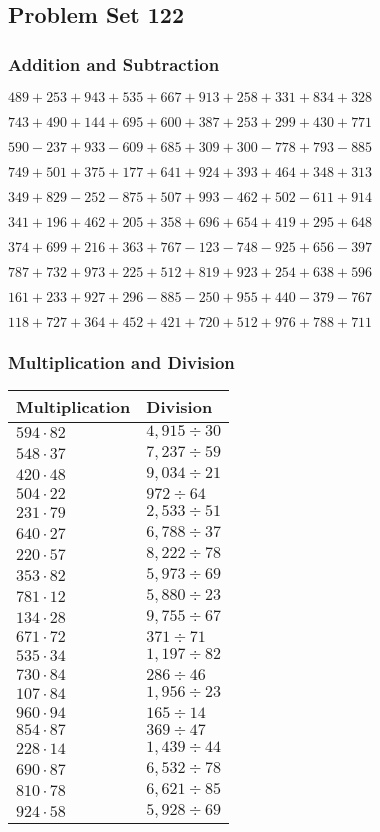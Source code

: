 \hypertarget{problem-set-122}{%
\subsection{Problem Set 122}\label{problem-set-122}}

\hypertarget{addition-and-subtraction}{%
\subsubsection{Addition and
Subtraction}\label{addition-and-subtraction}}

\(489 +253 +943 +535 +667 +913 +258 +331 +834 +328\)

\(743 +490 +144 +695 +600 +387 +253 +299 +430 +771\)

\(590 - 237 +933 - 609 +685 +309 +300 - 778 +793 - 885\)

\(749 +501 +375 +177 +641 +924 +393 +464 +348 +313\)

\(349 +829 - 252 - 875 +507 +993 - 462 +502 - 611 +914\)

\(341 +196 +462 +205 +358 +696 +654 +419 +295 +648\)

\(374 +699 +216 +363 +767 - 123 - 748 - 925 +656 - 397\)

\(787 +732 +973 +225 +512 +819 +923 +254 +638 +596\)

\(161 +233 +927 +296 - 885 - 250 +955 +440 - 379 - 767\)

\(118 +727 +364 +452 +421 +720 +512 +976 +788 +711\)

\hypertarget{multiplication-and-division}{%
\subsubsection{Multiplication and
Division}\label{multiplication-and-division}}

\begin{longtable}[]{@{}ll@{}}
\toprule
Multiplication & Division\tabularnewline
\midrule
\endhead
\(594 \cdot 82\) & \(4,915÷30\)\tabularnewline
\(548 \cdot 37\) & \(7,237÷59\)\tabularnewline
\(420 \cdot 48\) & \(9,034÷21\)\tabularnewline
\(504 \cdot 22\) & \(972÷64\)\tabularnewline
\(231 \cdot 79\) & \(2,533÷51\)\tabularnewline
\(640 \cdot 27\) & \(6,788÷37\)\tabularnewline
\(220 \cdot 57\) & \(8,222÷78\)\tabularnewline
\(353 \cdot 82\) & \(5,973÷69\)\tabularnewline
\(781 \cdot 12\) & \(5,880÷23\)\tabularnewline
\(134 \cdot 28\) & \(9,755÷67\)\tabularnewline
\(671 \cdot 72\) & \(371÷71\)\tabularnewline
\(535 \cdot 34\) & \(1,197÷82\)\tabularnewline
\(730 \cdot 84\) & \(286÷46\)\tabularnewline
\(107 \cdot 84\) & \(1,956÷23\)\tabularnewline
\(960 \cdot 94\) & \(165÷14\)\tabularnewline
\(854 \cdot 87\) & \(369÷47\)\tabularnewline
\(228 \cdot 14\) & \(1,439 ÷ 44\)\tabularnewline
\(690 \cdot 87\) & \(6,532÷78\)\tabularnewline
\(810 \cdot 78\) & \(6,621÷85\)\tabularnewline
\(924 \cdot 58\) & \(5,928÷69\)\tabularnewline
\bottomrule
\end{longtable}
